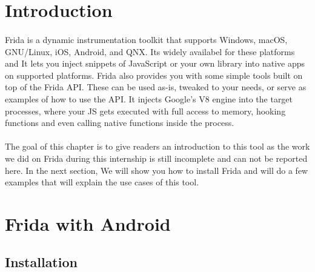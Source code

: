 \documentclass[../main.tex]{subfile}
\begin{document}
	\section{Introduction}
	\paragraph{}  Frida is a dynamic instrumentation toolkit that supports  Windows, macOS, GNU/Linux, iOS, Android, and QNX. Its widely availabel for these platforms and It lets you inject snippets of JavaScript or your own library into native apps on supported platforms. Frida also provides you with some simple tools built on top of the Frida API. These can be used as-is, tweaked to your needs, or serve as examples of how to use the API. It injects Google’s V8 engine into the target processes, where your JS gets executed with full access to memory, hooking functions and even calling native functions inside the process. \cite{frida}
	\paragraph{} The goal of this chapter is to give readers an introduction to this tool as the work we did on Frida during this internship is still incomplete and can not be reported here. In the next section, We will show you how to install Frida and will do a few examples that will explain the use cases of this tool.
	\section{Frida with Android}
	\subsection{Installation}
\end{document}
